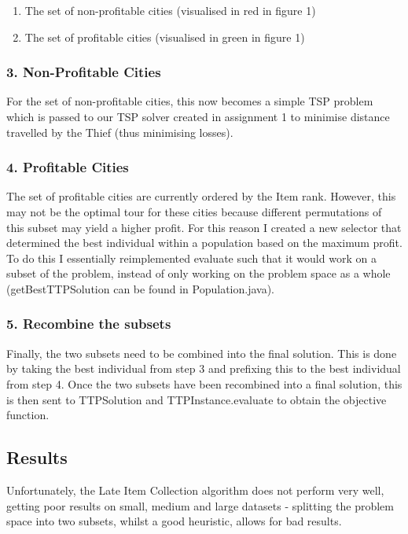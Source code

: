 \documentclass[a4paper,12pt]{article}
\begin{document}
\begin{enumerate}
\item The set of non-profitable cities (visualised in red in figure 1)
\item The set of profitable cities (visualised in green in figure 1)
\end{enumerate}

\subsubsection*{3. Non-Profitable Cities}
For the set of non-profitable cities, this now becomes a simple TSP problem which is passed to our TSP solver created in assignment 1 to minimise distance travelled by the Thief (thus minimising losses).

\subsubsection*{4. Profitable Cities}
The set of profitable cities are currently ordered by the Item rank. However, this may not be the optimal tour for these cities because different permutations of this subset may yield a higher profit. For this reason I created a new selector that determined the best individual within a population based on the maximum profit. To do this I essentially reimplemented evaluate such that it would work on a subset of the problem, instead of only working on the problem space as a whole (getBestTTPSolution can be found in Population.java).

\subsubsection*{5. Recombine the subsets}
Finally, the two subsets need to be combined into the final solution. This is done by taking the best individual from step 3 and prefixing this to the best individual from step 4. Once the two subsets have been recombined into a final solution, this is then sent to TTPSolution and TTPInstance.evaluate to obtain the objective function.


\subsection*{Results}
Unfortunately, the Late Item Collection algorithm does not perform very well, getting poor results on small, medium and large datasets - splitting the problem space into two subsets, whilst a good heuristic, allows for bad results.
\end{document}
